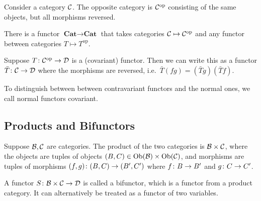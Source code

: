 \begin{definition}
    Consider a category \(\mathcal{C}\).
    The opposite category is \(\mathcal{C}^\text{op}\)
    consisting of the same objects, but all morphisms reversed.
\end{definition}
\begin{remark}
    There is a functor \(\textbf{Cat} \to \textbf{Cat}\)
    that takes categories \(\mathcal{C} \mapsto \mathcal{C}^\text{op}\)
    and any functor between categories \(T \mapsto T^\text{op}\).
\end{remark}

\begin{definition}
    Suppose \(T\colon\mathcal{C}^\text{op}\to\mathcal{D}\) is a (covariant) functor.
    Then we can write this as a functor \(\bar{T}\colon\mathcal{C}\to\mathcal{D}\)
    where the morphisms are reversed, i.e.\ \(\bar{T}(fg) = (\bar{T}g)(\bar{T}f)\).
\end{definition}
\begin{remark}
    To distinguish between between contravariant functors and the normal ones,
    we call normal functors covariant.
\end{remark}

\subsection*{Products and Bifunctors}

\begin{definition}
    Suppose \(\mathcal{B},\mathcal{C}\) are categories.
    The product of the two categories is \(\mathcal{B}\times\mathcal{C}\),
    where the objects are tuples of objects \((B,C) \in \operatorname{Ob}(\mathcal{B})\times\operatorname{Ob}(\mathcal{C})\),
    and morphisms are tuples of morphisms \((f,g)\colon(B,C)\to(B',C')\)
    where \(f\colon B\to B'\) and \(g\colon C\to C'\).
\end{definition}

\begin{definition}
    A functor \(S\colon\mathcal{B}\times\mathcal{C}\to\mathcal{D}\) is called a bifunctor,
    which is a functor from a product category.
    It can alternatively be treated as a functor of two variables.
\end{definition}

